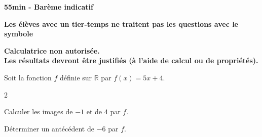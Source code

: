 \documentclass[11pt,a4paper]{article}  %
\begin{document}
	\graphicspath{{images/}}
	
	\begin{center}
	\end{center}

\begin{center}\textbf{55min - Barème indicatif}\end{center}
\begin{center}\textbf{Les élèves avec un tier-temps ne traitent pas les questions avec  le symbole }\end{center}
\begin{center}\textbf{Calculatrice non autorisée.\\Les résultats devront être justifiés (à l'aide de calcul ou de propriétés).}\end{center}


Soit la fonction $f$ définie sur $\mathbb{R}$ par $f(x)=5x+4$.
\begin{multicols}{2}
	\begin{enumMet}
		\item Calculer les images de $-1$ et de $4$ par $f$.
		\item Déterminer un antécédent de $-6$ par $f$.
	\end{enumMet}
\end{multicols}

\end{document}
